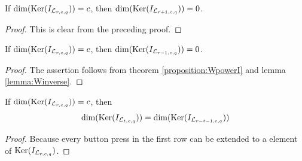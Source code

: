 \begin{corollary}
	If $\dim(\operatorname{Ker}(I_{\mathcal{L}_{r,c,q}})) = c$, then
	$\dim(\operatorname{Ker}(I_{\mathcal{L}_{r+1,c,q}})) = 0$. 
\end{corollary}

\begin{proof}
	This is clear from the preceding proof.
\end{proof}

\begin{proposition}
	If $\dim(\operatorname{Ker}(I_{\mathcal{L}_{r,c,q}})) = c$, then
	$\dim(\operatorname{Ker}(I_{\mathcal{L}_{r-1,c,q}})) = 0$. 
\end{proposition}

\begin{proof}
	The assertion follows from theorem \ref{proposition:WpowerI} and lemma
	\ref{lemma:Winverse}.
\end{proof}

\begin{proposition}
	If $\dim(\operatorname{Ker}(I_{\mathcal{L}_{r,c,q}})) = c$, then
	\[
		\dim(\operatorname{Ker}(I_{\mathcal{L}_{t,c,q}})) = \dim(\operatorname{Ker}(I_{\mathcal{L}_{r-t-1,c,q}}))
	\]
\end{proposition}

\begin{proof}
	Because every button press in the first row can be extended to a element
	of $\operatorname{Ker}(I_{\mathcal{L}_{r,c,q}})$.
\end{proof}
